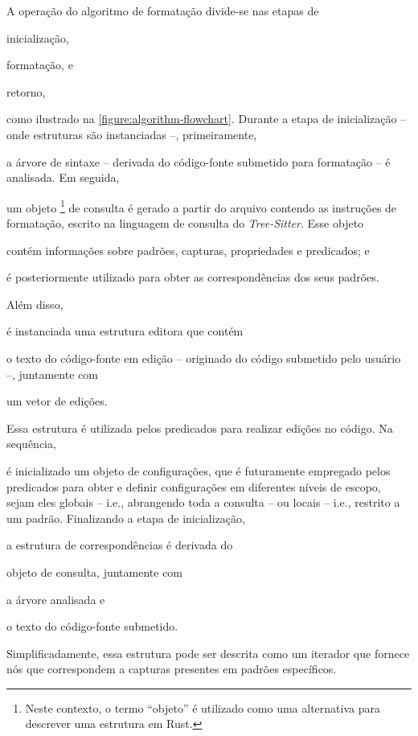 \documentclass
  [11pt,a4paper,english,brazil,openright,sumario=tradicional,twoside]
  {abntex2}
\newcommand{\treesitter}{\textit{Tree-Sitter}\xspace}
\begin{document}
{{  A operação do algoritmo de formatação divide-se nas etapas de
  \begin{inparaenum}
    \item inicialização,
    \item formatação, e
    \item retorno,
  \end{inparaenum}
  como ilustrado na \cref{figure:algorithm-flowchart}.
  Durante a etapa de inicialização -- onde estruturas são instanciadas --,
  primeiramente,
  \begin{inparaenum}
    \item a árvore de sintaxe -- derivada do código-fonte submetido para
          formatação -- é analisada. Em seguida,
    \item um objeto%
          \footnote
            { Neste contexto, o termo ``objeto'' é utilizado como uma
              alternativa para descrever uma estrutura em Rust.}
          de consulta é gerado a partir do arquivo contendo as
          instruções de formatação, escrito na linguagem de consulta do
          \treesitter. Esse objeto
          \begin{inparaenum}
            \item contém informações sobre padrões, capturas, propriedades e
                  predicados; e
            \item é posteriormente utilizado para obter as correspondências
                  dos seus padrões.
          \end{inparaenum}

          Além disso,
    \item é instanciada uma estrutura editora que contém
          \begin{inparaenum}
            \item o texto do código-fonte em edição -- originado do código
                  submetido pelo usuário --, juntamente com
            \item um vetor de edições.
          \end{inparaenum}
          Essa estrutura é utilizada pelos predicados para realizar edições no
          código. Na sequência,
    \item é inicializado um objeto de configurações, que é futuramente
          empregado pelos predicados para obter e definir configurações em
          diferentes níveis de escopo, sejam eles globais -- i.e., abrangendo
          toda a consulta -- ou locais -- i.e., restrito a um padrão.
          Finalizando a etapa de inicialização,
    \item a estrutura de correspondências é derivada do
          \begin{inparaenum}
            \item objeto de consulta, juntamente com
            \item a árvore analisada e
            \item o texto do código-fonte submetido.
          \end{inparaenum}
          Simplificadamente, essa estrutura pode ser descrita como um iterador
          que fornece nós que correspondem a capturas presentes em padrões
          específicos.
  \end{inparaenum}

}}
\end{document}
